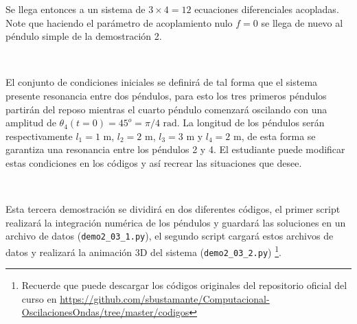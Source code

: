 Se llega entonces a un sistema de $3\times 4 = 12$ ecuaciones diferenciales 
acopladas. Note que haciendo el parámetro de acoplamiento nulo $f = 0$ se 
llega de nuevo al péndulo simple de la demostración 2.

\

El conjunto de condiciones iniciales se definirá de tal forma que el 
sistema presente resonancia entre dos péndulos, para esto los tres primeros
péndulos partirán del reposo mientras el cuarto péndulo comenzará oscilando
con una amplitud de $\theta_4(t=0) = 45^o = \pi /4 \mbox{ rad}$. La 
longitud de los péndulos serán respectivamente $l_1 = 1$ m, $l_2 = 2$ m, 
$l_3 = 3$ m y $l_4 = 2$ m, de esta forma se garantiza una resonancia 
entre los péndulos 2 y 4. El estudiante puede modificar estas condiciones
en los códigos y así recrear las situaciones que desee.

\

Esta tercera demostración se dividirá en dos diferentes códigos, el primer
script realizará la integración numérica de los péndulos y guardará las 
soluciones en un archivo de datos (\texttt{demo2\_03\_1.py}), el segundo 
script cargará estos archivos de datos y realizará la animación 3D del 
sistema (\texttt{demo2\_03\_2.py}) \footnote{Recuerde que puede descargar 
los códigos originales del repositorio oficial del curso en 
\url{https://github.com/sbustamante/Computacional-OscilacionesOndas/tree/master/codigos}}.


